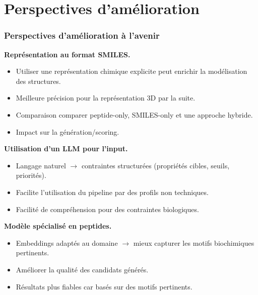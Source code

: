 \section{Perspectives d'amélioration}
\begin{frame}[t]
    \frametitle{Perspectives d'amélioration à l'avenir}

    \small
    \textbf{Représentation au format SMILES.} 
    \begin{itemize}
        \item Utiliser une représentation chimique explicite peut enrichir la modélisation des structures.
        \item Meilleure précision pour la représentation 3D par la suite.
        \item Comparaison comparer peptide-only, SMILES-only et une approche hybride.
        \item Impact sur la génération/scoring.
    \end{itemize} 
    \vspace{0.45cm}
    \textbf{Utilisation d'un LLM pour l'input.}
    \begin{itemize}
        \item Langage naturel $\rightarrow$ contraintes structurées (propriétés cibles, seuils, priorités).
        \item Facilite l'utilisation du pipeline par des profils non techniques.
        \item Facilité de compréhension pour des contraintes biologiques.
    \end{itemize}
    \vspace{0.45cm}
    \textbf{Modèle spécialisé en peptides.}
    \begin{itemize}
        \item Embeddings adaptés au domaine $\rightarrow$ mieux capturer les motifs biochimiques pertinents.
        \item Améliorer la qualité des candidats générés.
        \item Résultats plus fiables car basés sur des motifs pertinents.
    \end{itemize}
\end{frame}